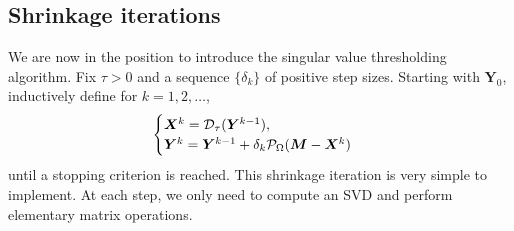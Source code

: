 \documentclass[conference,onecolumn,12pt]{IEEEtran}
\newcommand{\mtx}[1]{\bm{#1}}
\numberwithin{equation}{section}
\numberwithin{figure}{section}
\numberwithin{table}{section}
\theoremstyle{definition}
\begin{document}
  \subsection{Shrinkage iterations}

  We are now in the position to introduce the singular value
  thresholding algorithm. Fix $\tau > 0$ and a sequence $\{\delta_k\}$
  of positive step sizes. Starting with $\mtx{Y}_0$, inductively define
  for $k = 1, 2, \ldots$,
  \begin{equation}\label{eqn:iter}
  \begin{cases}
    \mtx{X}^{k}  = {\cal D}_\tau(\mtx{Y}^{k-1}),\cr
    \mtx{Y}^{k}  = \mtx{Y}^{k-1} + \delta_{k}
    \mathcal{P}_{\Omega}(\mtx{M}-\mtx{X}^k)
  \end{cases}
  \end{equation}
    until a stopping criterion is reached. This
  shrinkage iteration is very simple to implement. At each step, we only
  need to compute an SVD and perform elementary matrix operations.
  
\end{document}
